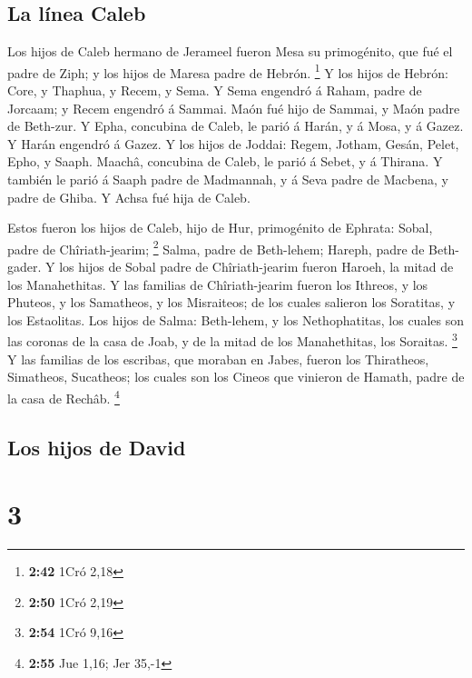 \hypertarget{la-luxednea-caleb-1}{%
\subsection{La línea Caleb}\label{la-luxednea-caleb-1}}

 Los hijos de Caleb hermano de Jerameel fueron Mesa su
primogénito, que fué el padre de Ziph; y los hijos de Maresa padre de
Hebrón. \footnote{\textbf{2:42} 1Cró 2,18}  Y los hijos
de Hebrón: Core, y Thaphua, y Recem, y Sema.  Y Sema
engendró á Raham, padre de Jorcaam; y Recem engendró á Sammai.
 Maón fué hijo de Sammai, y Maón padre de Beth-zur.
 Y Epha, concubina de Caleb, le parió á Harán, y á Mosa,
y á Gazez. Y Harán engendró á Gazez.  Y los hijos de
Joddai: Regem, Jotham, Gesán, Pelet, Epho, y Saaph. 
Maachâ, concubina de Caleb, le parió á Sebet, y á Thirana.
 Y también le parió á Saaph padre de Madmannah, y á Seva
padre de Macbena, y padre de Ghiba. Y Achsa fué hija de Caleb.

 Estos fueron los hijos de Caleb, hijo de Hur,
primogénito de Ephrata: Sobal, padre de Chîriath-jearim; \footnote{\textbf{2:50}
  1Cró 2,19}  Salma, padre de Beth-lehem; Hareph, padre
de Beth-gader.  Y los hijos de Sobal padre de
Chîriath-jearim fueron Haroeh, la mitad de los Manahethitas.
 Y las familias de Chîriath-jearim fueron los Ithreos, y
los Phuteos, y los Samatheos, y los Misraiteos; de los cuales salieron
los Soratitas, y los Estaolitas.  Los hijos de Salma:
Beth-lehem, y los Nethophatitas, los cuales son las coronas de la casa
de Joab, y de la mitad de los Manahethitas, los Soraitas. \footnote{\textbf{2:54}
  1Cró 9,16}  Y las familias de los escribas, que moraban
en Jabes, fueron los Thiratheos, Simatheos, Sucatheos; los cuales son
los Cineos que vinieron de Hamath, padre de la casa de Rechâb.
\footnote{\textbf{2:55} Jue 1,16; Jer 35,-1}

\hypertarget{los-hijos-de-david}{%
\subsection{Los hijos de David}\label{los-hijos-de-david}}

\hypertarget{section-2}{%
\section{3}\label{section-2}}


